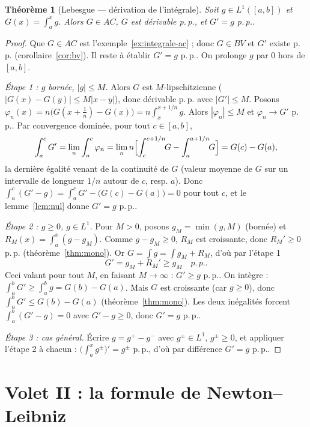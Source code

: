 \documentclass[11pt]{article}
\theoremstyle{thmblue}
\newtheorem{theoreme}{Théorème}[section]
\theoremstyle{defplain}
\theoremstyle{rem}
\newcommand{\pp}{p.\,p.}
\newcommand{\abs}[1]{\left\lvert #1 \right\rvert}
\begin{document}
\begin{theoreme}[Lebesgue --- dérivation de l'intégrale]\label{thm:volet1}
Soit $g\in L^1([a,b])$ et $G(x)=\int_a^x g$. Alors $G\in AC$, $G$ est dérivable \pp, et $G'=g$ \pp.
\end{theoreme}

\begin{proof}
Que $G\in AC$ est l'exemple~\ref{ex:integrale-ac} ; donc $G\in BV$ et $G'$ existe \pp{}
(corollaire~\ref{cor:bv}). Il reste à établir $G'=g$ \pp. On prolonge $g$ par $0$ hors de $[a,b]$.

\emph{Étape 1 : $g$ bornée, $\abs g\le M$.} Alors $G$ est $M$-lipschitzienne
($\abs{G(x)-G(y)}\le M\abs{x-y}$), donc dérivable \pp{} avec $\abs{G'}\le M$. Posons
$\varphi_n(x)=n\bigl(G(x+\tfrac1n)-G(x)\bigr)=n\int_x^{x+1/n}g$. Alors $\abs{\varphi_n}\le M$ et
$\varphi_n\to G'$ \pp. Par convergence dominée, pour tout $c\in[a,b]$,
\[
\int_a^c G'=\lim_n\int_a^c\varphi_n
=\lim_n n\Bigl[\int_c^{c+1/n}\!\!G-\int_a^{a+1/n}\!\!G\Bigr]=G(c)-G(a),
\]
la dernière égalité venant de la continuité de $G$ (valeur moyenne de $G$ sur un intervalle de longueur
$1/n$ autour de $c$, resp. $a$). Donc $\int_a^c(G'-g)=\int_a^c G'-\bigl(G(c)-G(a)\bigr)=0$ pour tout
$c$, et le lemme~\ref{lem:nul} donne $G'=g$ \pp.

\emph{Étape 2 : $g\ge0$, $g\in L^1$.} Pour $M>0$, posons $g_M=\min(g,M)$ (bornée) et
$R_M(x)=\int_a^x(g-g_M)$. Comme $g-g_M\ge0$, $R_M$ est croissante, donc $R_M'\ge0$ \pp{}
(théorème~\ref{thm:mono}). Or $G=\int g=\int g_M+R_M$, d'où par l'étape 1
\[
G'=g_M+R_M'\ge g_M\quad\pp.
\]
Ceci valant pour tout $M$, en faisant $M\to\infty$ : $G'\ge g$ \pp. On intègre : $\int_a^b G'\ge
\int_a^b g=G(b)-G(a)$. Mais $G$ est croissante (car $g\ge0$), donc $\int_a^b G'\le G(b)-G(a)$
(théorème~\ref{thm:mono}). Les deux inégalités forcent $\int_a^b(G'-g)=0$ avec $G'-g\ge0$, donc
$G'=g$ \pp.

\emph{Étape 3 : cas général.} Écrire $g=g^+-g^-$ avec $g^\pm\in L^1$, $g^\pm\ge0$, et appliquer
l'étape 2 à chacun : $\bigl(\int_a^x g^\pm\bigr)'=g^\pm$ \pp, d'où par différence $G'=g$ \pp.
\end{proof}

\section{Volet II : la formule de Newton--Leibniz}
\end{document}
